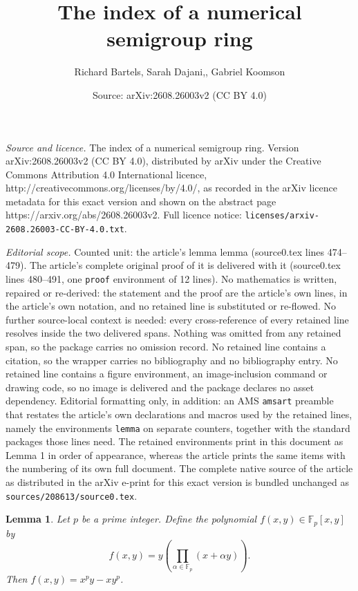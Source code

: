 \documentclass[10pt,a4paper]{amsart}
\title{The index of a numerical semigroup ring}
\author{Richard Bartels, Sarah Dajani,, Gabriel Koomson}
\date{Source: arXiv:2608.26003v2 (CC BY 4.0)}
\newtheorem{lemma}{Lemma}
\begin{document}
\maketitle

\noindent\emph{Source and licence.} The index of a numerical semigroup ring. Version arXiv:2608.26003v2 (CC BY 4.0), distributed by arXiv under the Creative Commons Attribution 4.0 International licence, http://creativecommons.org/licenses/by/4.0/, as recorded in the arXiv licence metadata for this exact version and shown on the abstract page https://arxiv.org/abs/2608.26003v2. Full licence notice: \texttt{licenses/arxiv-2608.26003-CC-BY-4.0.txt}.\par\smallskip

\noindent\textit{Editorial scope.} Counted unit: the article's lemma lemma (source0.tex lines 474--479). The article's complete original proof of it is delivered with it (source0.tex lines 480--491, one \texttt{proof} environment of 12 lines). No mathematics is written, repaired or re-derived: the statement and the proof are the article's own lines, in the article's own notation, and no retained line is substituted or re-flowed.  No further source-local context is needed: every cross-reference of every retained line resolves inside the two delivered spans.  Nothing was omitted from any retained span, so the package carries no omission record.  No retained line contains a citation, so the wrapper carries no bibliography and no bibliography entry.  No retained line contains a figure environment, an image-inclusion command or drawing code, so no image is delivered and the package declares no asset dependency.  Editorial formatting only, in addition: an AMS \texttt{amsart} preamble that restates the article's own declarations and macros used by the retained lines, namely the environments \texttt{lemma} on separate counters, together with the standard packages those lines need.  The retained environments print in this document as Lemma 1 in order of appearance, whereas the article prints the same items with the numbering of its own full document.  The complete native source of the article as distributed in the arXiv e-print for this exact version is bundled unchanged as \texttt{sources/208613/source0.tex}.
\begin{lemma}
Let $p$ be a prime integer. Define the polynomial $f(x,y) \in \mathbb{F}_{p}[x,y]$ by 
\[
f(x,y) = y \left(\prod\limits_{\alpha \in \mathbb{F}_p} (x+\alpha y) \right).
\] Then $f(x,y)=x^p y-xy^p$.
\end{lemma}\text{}\\
\end{document}
